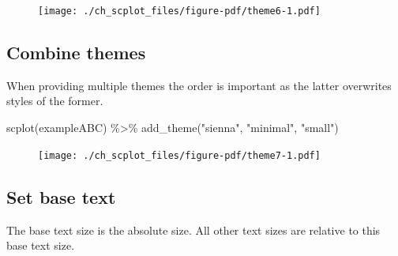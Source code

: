 \documentclass[
  letterpaper,
  DIV=11,
  numbers=noendperiod]{scrreprt}
\newenvironment{Shaded}{\begin{snugshade}}{\end{snugshade}}
\newcommand{\AttributeTok}[1]{\textcolor[rgb]{0.40,0.45,0.13}{#1}}
\newcommand{\DecValTok}[1]{\textcolor[rgb]{0.68,0.00,0.00}{#1}}
\newcommand{\FunctionTok}[1]{\textcolor[rgb]{0.28,0.35,0.67}{#1}}
\newcommand{\NormalTok}[1]{\textcolor[rgb]{0.00,0.23,0.31}{#1}}
\newcommand{\SpecialCharTok}[1]{\textcolor[rgb]{0.37,0.37,0.37}{#1}}
\newcommand{\StringTok}[1]{\textcolor[rgb]{0.13,0.47,0.30}{#1}}
\begin{document}
\begin{figure}[H]

{\centering \texttt{[image: ./ch\_scplot\_files/figure-pdf/theme6-1.pdf]}

}

\end{figure}

\hypertarget{combine-themes}{%
\subsection{Combine themes}\label{combine-themes}}

When providing multiple themes the order is important as the latter
overwrites styles of the former.

\begin{Shaded}
\begin{Highlighting}[]
\FunctionTok{scplot}\NormalTok{(exampleABC) }\SpecialCharTok{\%\textgreater{}\%}
  \FunctionTok{add\_theme}\NormalTok{(}\StringTok{"sienna"}\NormalTok{, }\StringTok{"minimal"}\NormalTok{, }\StringTok{"small"}\NormalTok{)}
\end{Highlighting}
\end{Shaded}

\begin{figure}[H]

{\centering \texttt{[image: ./ch\_scplot\_files/figure-pdf/theme7-1.pdf]}

}

\end{figure}

\hypertarget{set-base-text}{%
\subsection{Set base text}\label{set-base-text}}

The base text size is the absolute size. All other text sizes are
relative to this base text size.

\begin{Shaded}
\end{Shaded}
\end{document}
